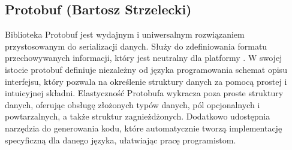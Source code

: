\subsection{Protobuf (Bartosz Strzelecki)}

Biblioteka Protobuf jest wydajnym i uniwersalnym rozwiązaniem przystosowanym do serializacji
danych. Służy do zdefiniowania formatu przechowywanych informacji, który jest neutralny dla platformy
.  W swojej istocie protobuf definiuje niezależny od języka programowania schemat opisu interfejsu,
który pozwala na określenie struktury danych za pomocą prostej i intuicyjnej składni.
Elastyczność Protobufa wykracza poza proste struktury danych, oferując obsługę złożonych typów danych, pól opcjonalnych i powtarzalnych,
a także struktur zagnieżdżonych. Dodatkowo udostępnia narzędzia do generowania kodu,
które automatycznie tworzą implementację specyficzną dla danego języka, ułatwiając pracę programistom.
